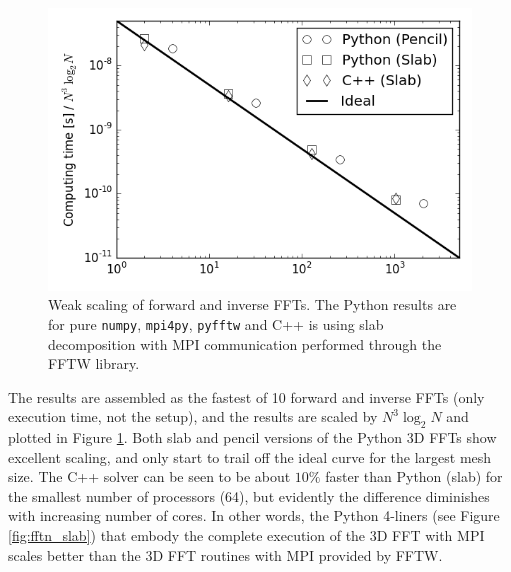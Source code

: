 \documentclass[final,1p,times]{elsarticle}
\newcommand{\inpyth}{\lstinline[style=inlinestyle]} %[]%
\begin{document}


\begin{figure}[ht!]
\centering
\includegraphics[scale=0.48]{weak_scaling_fft_1024.png}
\caption{Weak scaling of forward and inverse FFTs. The Python results are for pure \texttt{numpy}, \texttt{mpi4py}, \texttt{pyfftw} and C++ is using slab decomposition with MPI communication performed through the FFTW library.}
\label{fig:weak_FFT_scaling}
\end{figure}

The results are assembled as the fastest of 10 forward and inverse FFTs (only execution time, not the setup), and the results
are scaled by $N^3 \log_2N$ and plotted in Figure \ref{fig:weak_FFT_scaling}. Both slab and pencil versions of the Python 3D FFTs show excellent scaling,
and only start to trail off the ideal curve for the largest mesh size. The C++ solver can be seen to be about $10 \%$ faster than Python (slab) for the smallest number of processors (64), but evidently the difference diminishes with increasing number of cores. In other words, the Python 4-liners (see Figure \ref{fig:fftn_slab}) that embody the complete execution of the 3D FFT with MPI scales better than the 3D FFT routines with MPI provided by FFTW.
\end{document}

